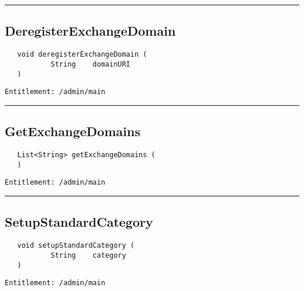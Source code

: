 \rule{12cm}{2pt}
\subsection{DeregisterExchangeDomain}
\label{Api:DeregisterExchangeDomain}
\begin{verbatim}
   void deregisterExchangeDomain (
           String    domainURI
   )
\end{verbatim}
\begin{Verbatim}[fontsize=\small, formatcom=\color{Maroon}]
  Entitlement: /admin/main
\end{Verbatim}



\rule{12cm}{2pt}
\subsection{GetExchangeDomains}
\label{Api:GetExchangeDomains}
\begin{verbatim}
   List<String> getExchangeDomains (
   )
\end{verbatim}
\begin{Verbatim}[fontsize=\small, formatcom=\color{Maroon}]
  Entitlement: /admin/main
\end{Verbatim}



\rule{12cm}{2pt}
\subsection{SetupStandardCategory}
\label{Api:SetupStandardCategory}
\begin{verbatim}
   void setupStandardCategory (
           String    category
   )
\end{verbatim}
\begin{Verbatim}[fontsize=\small, formatcom=\color{Maroon}]
  Entitlement: /admin/main
\end{Verbatim}



